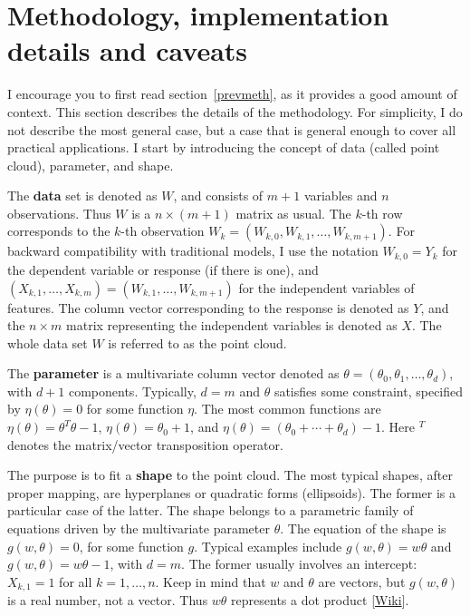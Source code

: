 \documentclass[oneside,10pt]{book}
\begin{document}
\section{Methodology, implementation details and caveats}

I encourage you to first read section~\ref{prevmeth}, as it provides a good amount of context. This section describes the details of the methodology.
For simplicity, I do not describe the most general case, but a case that is general enough to cover all practical applications. I start by introducing the concept of data (called point cloud), parameter, and shape.

The {\bf data} set is denoted
 as $W$, and consists of $m+1$ variables and $n$ observations. Thus $W$ is a $n \times (m+1)$ matrix as usual. The $k$-th row
 corresponds to the $k$-th observation $W_k=(W_{k,0},W_{k,1},\dots,W_{k, m+1})$. For backward compatibility with traditional models, I use the notation $W_{k,0}=Y_k$ for the dependent variable or response (if there is one), and $(X_{k,1},\dots,X_{k,m})=(W_{k,1},\dots,W_{k, m+1})$ for
 the independent variables of features. The column vector corresponding to the response is denoted as $Y$, and the $n\times m$ matrix
 representing the independent variables is denoted as $X$. The whole data set $W$ is referred to as the point cloud.

The {\bf parameter} is a multivariate
 column vector denoted as $\theta=(\theta_0,\theta_1,\dots,\theta_d)$, with $d+1$ components. Typically, $d=m$ and $\theta$ satisfies some  constraint, specified by $\eta(\theta)=0$
 for some function $\eta$. The most common functions are $\eta(\theta)=\theta^T\theta-1$, $\eta(\theta)=\theta_0+1$, and
  $\eta(\theta)=(\theta_0+\cdots + \theta_d) - 1$. Here $^T$ denotes the matrix/vector transposition operator.

The purpose is to fit a {\bf shape} to the point cloud. The most typical shapes, after proper mapping, are hyperplanes or quadratic forms (ellipsoids). The
 former is a particular case of the latter. The shape belongs to a parametric family of equations driven by the multivariate parameter $\theta$. The equation of the shape is $g(w,\theta)=0$, for some function $g$. Typical examples include $g(w,\theta)=w\theta$ and $g(w,\theta)=w\theta-1$, with $d=m$.
The former usually involves an intercept: $X_{k,1}=1$ for all $k=1,\dots,n$. Keep in mind that $w$ and $\theta$ are vectors, but $g(w,\theta)$ is a real number, not a vector. Thus $w\theta$ represents a \textcolor{index}{dot product} [\href{https://en.wikipedia.org/wiki/Dot_product}{Wiki}].
\end{document}
